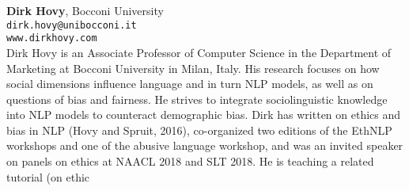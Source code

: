 {{\bfseries Dirk Hovy},
Bocconi University\\
{\tt dirk.hovy@unibocconi.it}\\
{\tt www.dirkhovy.com}\\
Dirk Hovy is an Associate Professor of Computer Science in the Department of Marketing at
Bocconi University in Milan, Italy. His research
focuses on how social dimensions influence language and in turn NLP models, as well as on
questions of bias and fairness. He strives to integrate sociolinguistic knowledge into NLP models to counteract demographic bias. Dirk has written on ethics and bias in NLP (Hovy and Spruit,
2016), co-organized two editions of the EthNLP
workshops and one of the abusive language workshop, and was an invited speaker on panels on
ethics at NAACL 2018 and SLT 2018. He is
teaching a related tutorial (on ethic

}